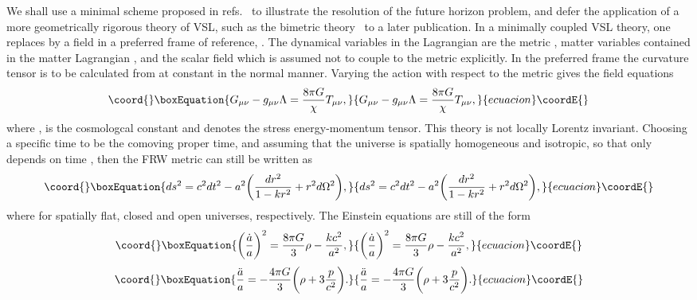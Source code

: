 \documentclass[a4paper,12pt]{article}
\begin{document}
We shall use a minimal scheme proposed in
refs.~\cite{Albrecht,Barrow,Barrow2} to illustrate the resolution of the
future horizon problem, and defer the application of a more geometrically
rigorous theory of VSL, such as the bimetric
theory~\cite{Clayton,Drummond,Liberati} to a later publication. In a
minimally coupled VSL theory, one replaces \coordHE{} by a field in a preferred
frame of reference, \coordHE{}. The dynamical variables in the
Lagrangian \coordHE{} are the metric \coordHE{}, matter variables
contained in the matter Lagrangian \coordHE{}, and the scalar field
\myHighlight{$\chi$}\coordHE{} which is assumed not to couple to the metric explicitly. In the
preferred frame the curvature tensor is to be calculated from \coordHE{}
at constant \myHighlight{$\chi$}\coordHE{} in the normal manner. Varying the action with respect to
the metric gives the field equations
\begin{equation}\coord{}\boxEquation{
G_{\mu\nu}-g_{\mu\nu}\Lambda=\frac{8\pi G}{\chi}T_{\mu\nu},
}{
G_{\mu\nu}-g_{\mu\nu}\Lambda=\frac{8\pi G}{\chi}T_{\mu\nu},
}{ecuacion}\coordE{}\end{equation}
where \coordHE{}, \myHighlight{$\Lambda$}\coordHE{} is the
cosmologcal constant and \coordHE{} denotes the stress energy-momentum
tensor. This theory is not locally Lorentz invariant. Choosing a specific
time to be the comoving proper time, and assuming that the universe is
spatially homogeneous and isotropic, so that \coordHE{} only depends on time
\coordHE{}, then the FRW metric can still be written as
\begin{equation}\coord{}\boxEquation{
ds^2=c^2dt^2-a^2\biggl(\frac{dr^2}{1-kr^2}+r^2d\Omega^2\biggr),
}{
ds^2=c^2dt^2-a^2\biggl(\frac{dr^2}{1-kr^2}+r^2d\Omega^2\biggr),
}{ecuacion}\coordE{}\end{equation}
where \coordHE{} for spatially flat, closed and open
universes, respectively. The Einstein equations are still of the form
\begin{equation}\coord{}\boxEquation{
\biggl(\frac{{\dot a}}{a}\biggr)^2=\frac{8\pi
G}{3}\rho-\frac{kc^2}{a^2},
}{
\biggl(\frac{{\dot a}}{a}\biggr)^2=\frac{8\pi
G}{3}\rho-\frac{kc^2}{a^2},
}{ecuacion}\coordE{}\end{equation}
\begin{equation}\coord{}\boxEquation{
\label{accelerationeq} \frac{{\ddot a}}{a}=-\frac{4\pi
G}{3}\biggl(\rho+3\frac{p}{c^2}\biggr).
}{
\frac{{\ddot a}}{a}=-\frac{4\pi
G}{3}\biggl(\rho+3\frac{p}{c^2}\biggr).
}{ecuacion}\coordE{}\end{equation}
\end{document}
